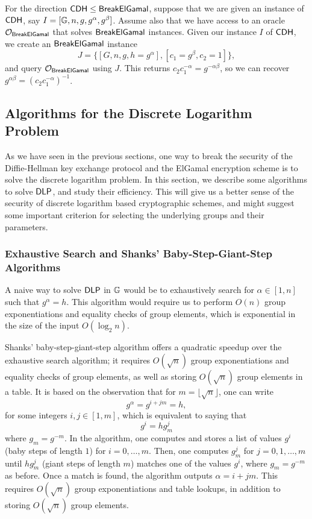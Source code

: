 For the direction ${\sf CDH} \leq {\sf BreakElGamal}$, suppose that we are given an 
instance of ${\sf CDH}$, say $I = [\mathbb{G}, n, g, g^\alpha, g^\beta]$. Assume also that 
we have access to an oracle ${\cal O}_{{\sf BreakElGamal}}$ that solves 
${\sf BreakElGamal}$ instances. Given our instance $I$ of ${\sf CDH}$, we create an 
${\sf BreakElGamal}$ instance 
\[ J = \{[G, n, g, h = g^\alpha], [c_1 = g^\beta, c_2 = 1]\}, \] 
and query ${\cal O}_{{\sf BreakElGamal}}$ using $J$. This returns $c_2c_1^{-\alpha} 
= g^{-\alpha\beta}$, so we can recover $g^{\alpha\beta} = (c_2c_1^{-\alpha})^{-1}$. 

\subsection{Algorithms for the Discrete Logarithm Problem}
As we have seen in the previous sections, one way to break the security of the 
Diffie-Hellman key exchange protocol and the ElGamal encryption scheme is to solve 
the discrete logarithm problem. In this section, we describe some algorithms to 
solve ${\sf DLP}$, and study their efficiency. This will give us a better sense of the 
security of discrete logarithm based cryptographic schemes, and might suggest some 
important criterion for selecting the underlying groups and their parameters.

\subsubsection{Exhaustive Search and Shanks' Baby-Step-Giant-Step Algorithms}
A naive way to solve ${\sf DLP}$ in $\mathbb{G}$ would be to exhaustively search for $\alpha
\in [1, n]$ such that $g^\alpha = h$. This algorithm would require us to perform 
$O(n)$ group exponentiations and equality checks of group elements, which is 
exponential in the size of the input $O(\log_2 n)$.

Shanks' baby-step-giant-step algorithm offers a quadratic speedup over the 
exhaustive search algorithm; it requires $O(\sqrt{n})$ group exponentiations 
and equality checks of group elements, as well as storing $O(\sqrt{n})$ 
group elements in a table. It is based on the observation that for 
$m = \lfloor{\sqrt n}\rfloor$, one can write 
\[ g^\alpha = g^{i+jm} = h, \] 
for some integers $i, j \in [1, m]$, which is equivalent to saying that 
\[ g^i = hg_m^j \] 
where $g_m = g^{-m}$. In the algorithm, one computes and stores a list of 
values $g^i$ (baby steps of length $1$) for $i = 0, \dots, m$. Then, one 
computes $g_m^j$ for $j = 0, 1, \dots, m$ until $hg_m^j$ (giant steps of 
length $m$) matches one of the values $g^i$, where $g_m = g^{-m}$ as before. 
Once a match is found, the algorithm outputs $\alpha = i + jm$. This 
requires $O(\sqrt n)$ group exponentiations and table lookups, in addition 
to storing $O(\sqrt n)$ group elements. 

